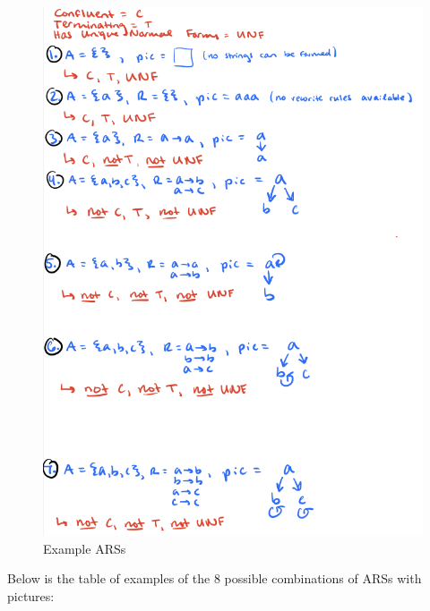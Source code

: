 \documentclass{article}
\theoremstyle{theorem}
\theoremstyle{definition}
\theoremstyle{remark}
\begin{document}
\begin{figure}[H]
\begin{center}
\includegraphics[scale=1]{img/ExampleARSs.png}
\end{center}
\caption{Example ARSs}\label{WS}
\end{figure}

Below is the table of examples of the 8 possible combinations of ARSs with pictures:
\end{document}
